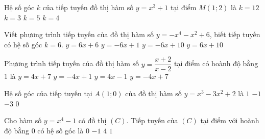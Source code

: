 \begin{ex}%
	Hệ số góc $k$ của tiếp tuyến đồ thị hàm số $y = x^3 + 1$ tại điểm $M(1; 2)$ là
	\choice
	{$k = 12$}
	{\True $k = 3$}
	{$k = 5$}
	{$k = 4$}
\end{ex}%
\begin{ex}%
Viết phương trình tiếp tuyến của đồ thị hàm số $ y = -x^4 - x^2 + 6$, biết tiếp tuyến có hệ số góc $k = 6$.
\choice
{$ y = 6x + 6$}
{$ y = -6x + 1$}
{$ y = -6x + 10$}
{\True $ y = 6x + 10$}
\end{ex}%
\begin{ex}%
		Phương trình tiếp tuyến của đồ thị hàm số $y=\dfrac{x+2}{x-2}$ tại điểm có hoành độ bằng $1$ là
		\choice
		{$y=4x+7$}
		{\True $y=-4x+1$}
		{$y=4x-1$}
		{$y=-4x+7$}
	\end{ex}%
\begin{ex}%
	Hệ số góc của tiếp tuyến tại $A(1;0)$ của đồ thị hàm số $y=x^3-3x^2+2$ là
	\choice
	{$1$}
	{$-1$}
	{\True $-3$}
	{$0$}
\end{ex}%
\begin{ex}%
	Cho hàm số $y=x^4-1$ có đồ thị $(C)$. Tiếp tuyến của $(C)$ tại điểm với hoành độ bằng $0$ có hệ số góc là
	\choice
	{\True $ 0 $}
	{$ -1 $}
	{$ 4 $}
	{$ 1 $}
\end{ex}